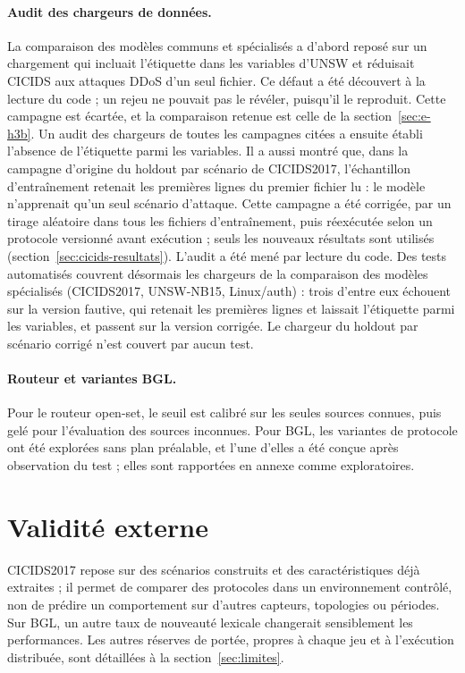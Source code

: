 \paragraph{Audit des chargeurs de données.}
La comparaison des modèles communs et spécialisés a d'abord reposé sur un chargement qui
incluait l'étiquette dans les variables d'UNSW et réduisait CICIDS aux attaques DDoS d'un
seul fichier. Ce défaut a été découvert à la lecture du code ; un rejeu ne pouvait pas le
révéler, puisqu'il le reproduit. Cette campagne est écartée, et la comparaison retenue est
celle de la section~\ref{sec:e-h3b}. Un audit des chargeurs de toutes les campagnes citées a
ensuite établi l'absence de l'étiquette parmi les variables. Il a aussi montré que, dans la
campagne d'origine du holdout par scénario de CICIDS2017, l'échantillon d'entraînement
retenait les premières lignes du premier fichier lu : le modèle n'apprenait qu'un seul
scénario d'attaque. Cette campagne a été corrigée, par un tirage aléatoire dans tous les
fichiers d'entraînement, puis réexécutée selon un protocole versionné avant exécution ;
seuls les nouveaux résultats sont utilisés (section~\ref{sec:cicids-resultats}). L'audit a
été mené par lecture du code. Des tests automatisés couvrent désormais les chargeurs de la
comparaison des modèles spécialisés (CICIDS2017, UNSW-NB15, Linux/auth) : trois d'entre eux
échouent sur la version fautive, qui retenait les premières lignes et laissait l'étiquette
parmi les variables, et passent sur la version corrigée. Le chargeur du holdout par
scénario corrigé n'est couvert par aucun test.

\paragraph{Routeur et variantes BGL.}
Pour le routeur open-set, le seuil est calibré sur les seules sources connues, puis gelé
pour l'évaluation des sources inconnues. Pour BGL, les variantes de protocole ont été
explorées sans plan préalable, et l'une d'elles a été conçue après observation du test ;
elles sont rapportées en annexe comme exploratoires.

\section{Validité externe}

CICIDS2017 repose sur des scénarios construits et des caractéristiques déjà extraites ; il
permet de comparer des protocoles dans un environnement contrôlé, non de prédire un
comportement sur d'autres capteurs, topologies ou périodes. Sur BGL, un autre taux de
nouveauté lexicale changerait sensiblement les performances. Les autres réserves de portée,
propres à chaque jeu et à l'exécution distribuée, sont détaillées à la
section~\ref{sec:limites}.

